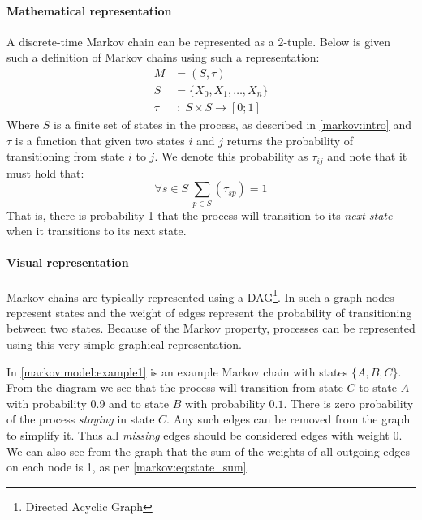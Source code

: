 \paragraph{Mathematical representation}
A discrete-time Markov chain can be represented as a 2-tuple.
Below is given such a definition of Markov chains using such a representation:
\begin{align}
M & = (S, \tau)\\
S & = \{X_0, X_1, \dots, X_n\} \nonumber\\
\tau & \; : \; S \times S \rightarrow [0; 1] \nonumber
\end{align}
Where $S$ is a finite set of states in the process, as described in \cref{markov:intro} and $\tau$ is a function that given two states $i$ and $j$ returns the probability of transitioning from state $i$ to $j$.
We denote this probability as $\tau_{ij}$ and note that it must hold that:
\begin{equation}\label{markov:eq:state_sum}
\forall s \in S \: \sum_{p \in S} (\tau_{sp}) = 1
\end{equation}
That is, there is probability 1 that the process will transition to its \emph{next state} when it transitions to its next state.

\paragraph{Visual representation}
Markov chains are typically represented using a DAG\footnote{Directed Acyclic Graph}.
In such a graph nodes represent states and the weight of edges represent the probability of transitioning between two states.
Because of the Markov property, processes can be represented using this very simple graphical representation.

In \cref{markov:model:example1} is an example Markov chain with states $\{A, B, C\}$.
From the diagram we see that the process will transition from state $C$ to state $A$ with probability $0.9$ and to state $B$ with probability $0.1$.
There is zero probability of the process \textit{staying} in state $C$.
Any such edges can be removed from the graph to simplify it.
Thus all \emph{missing} edges should be considered edges with weight 0.
We can also see from the graph that the sum of the weights of all outgoing edges on each node is 1, as per \cref{markov:eq:state_sum}.

